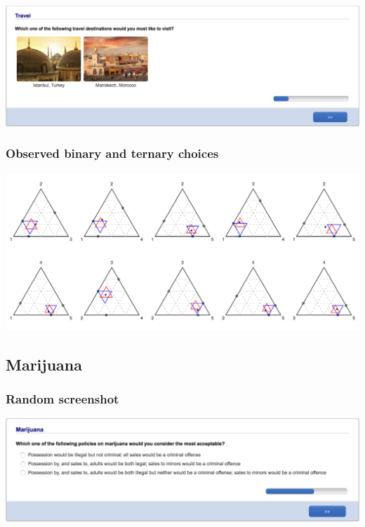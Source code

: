 \documentclass[11pt,letter]{article}
\begin{document}
\includegraphics[width=15cm]{Population_study_design/screenshot_Travel.png}

\subsubsection*{Observed binary and ternary choices}

\includegraphics[width=15cm]{./Population_study_data/Simplexes/Travel.pdf}

\pagebreak

\subsection*{Marijuana}



\subsubsection*{Random screenshot}

\includegraphics[width=15cm]{Population_study_design/screenshot_Marijuana.png}
\end{document}
